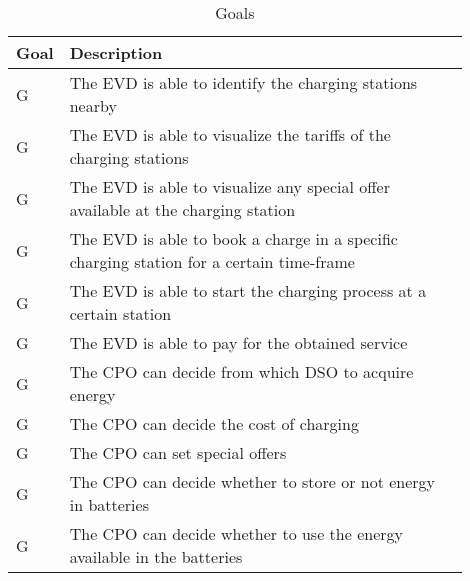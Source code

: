 \setcounter{gc}{1}
\newcommand{\gcnt}{\thegc\stepcounter{gc}}
\begin{table}[H]
    \centering
    \begin{tabular}{|l|p{0.9\linewidth}|}
     \hline
     \textbf{Goal} & \textbf{Description} \\
     \hline
     G\gcnt & The EVD is able to identify the charging stations nearby \\
     \hline
     G\gcnt & The EVD is able to visualize the tariffs of the charging stations \\
     \hline
     G\gcnt & The EVD is able to visualize any special offer available at the charging station \\
     \hline
     G\gcnt & The EVD is able to book a charge in a specific charging station for a certain time-frame\\
     \hline
     G\gcnt & The EVD is able to start the charging process at a certain station \\
     \hline
     G\gcnt & The EVD is able to pay for the obtained service \\
     \hline
     G\gcnt & The CPO can decide from which DSO to acquire energy \\
     \hline 
     G\gcnt & The CPO can decide the cost of charging \\
     \hline 
     G\gcnt & The CPO can set special offers \\
     \hline 
     G\gcnt & The CPO can decide whether to store or not energy in batteries \\
     \hline 
     G\gcnt & The CPO can decide whether to use the energy available in the batteries \\
     \hline 
\end{tabular}
    \caption{Goals}
    \label{tab:Goals}
\end{table}


